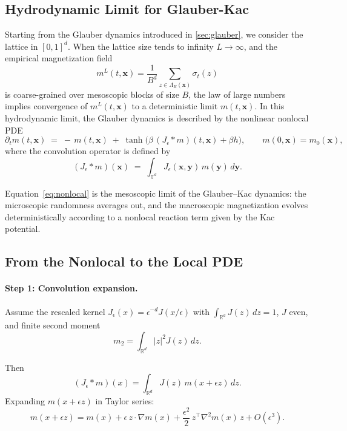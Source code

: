 \documentclass[11pt,a4paper]{article}
\begin{document}
\subsection{Hydrodynamic Limit for Glauber-Kac}
\label{subsec:hydro}
Starting from the Glauber dynamics introduced in \cref{sec:glauber}, we consider the lattice in $[0,1]^d$. When the lattice size tends to infinity $L\to\infty$, and the empirical magnetization field
\begin{equation}
    m^L(t,\mathbf{x}) = \frac{1}{B^d}\sum_{z\in \Lambda_B(\mathbf{x})} \sigma_t(z)
\end{equation}
is coarse-grained over mesoscopic blocks of size $B$, the law of large numbers implies convergence of $m^L(t,\mathbf{x})$ to a deterministic limit $m(t,\mathbf{x})$. 
In this hydrodynamic limit, the Glauber dynamics is described by the nonlinear nonlocal PDE
\begin{equation}\label{eq:nonlocal}
    \partial_t m(t,\mathbf{x}) \;=\; -\,m(t,\mathbf{x})\;+\;\tanh\!\Big(\beta\, (J_\epsilon * m)(t,\mathbf{x}) + \beta h\Big), 
    \qquad m(0,\mathbf{x})=m_0(\mathbf{x}),
\end{equation}
where the convolution operator is defined by
\begin{equation}
    \label{eq:convolution}
    (J_\epsilon * m)(\mathbf{x}) \;=\; \int_{\mathbb{T}^d} J_\epsilon(\mathbf{x},\mathbf{y})\,m(\mathbf{y})\,d\mathbf{y}.
\end{equation}

Equation~\eqref{eq:nonlocal} is the mesoscopic limit of the Glauber--Kac dynamics: 
the microscopic randomness averages out, and the macroscopic magnetization evolves deterministically according to a nonlocal reaction term given by the Kac potential.

\subsection{From the Nonlocal to the Local PDE}\paragraph{Step 1: Convolution expansion.}
Assume the rescaled kernel $J_\epsilon(x) = \epsilon^{-d} J(x/\epsilon)$ with $\int_{\mathbb{R}^d} J(z)\,dz = 1$, $J$ even, and finite second moment 
\begin{equation}
m_2 = \int_{\mathbb{R}^d} |z|^2 J(z)\,dz.
\end{equation}

Then
\begin{equation}
    (J_\epsilon * m)(x) = \int_{\mathbb{R}^d} J(z)\, m(x+\epsilon z)\,dz.
\end{equation}
Expanding $m(x+\epsilon z)$ in Taylor series:
\begin{equation}
m(x+\epsilon z) = m(x) + \epsilon\, z\cdot \nabla m(x) 
+ \frac{\epsilon^2}{2}\, z^\top \nabla^2 m(x)\, z + O(\epsilon^3).
\end{equation}
\end{document}
